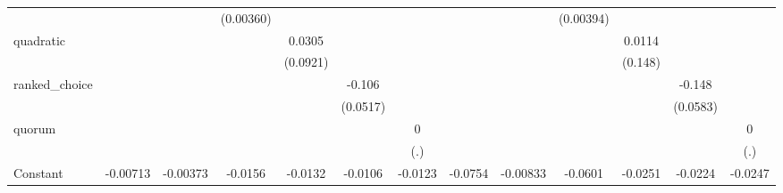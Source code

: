 {\begin{tabular}{l*{12}{c}}
                    &                     &                     &   (0.00360)         &                     &                     &                     &                     &                     &   (0.00394)         &                     &                     &                     \\
quadratic           &                     &                     &                     &      0.0305         &                     &                     &                     &                     &                     &      0.0114         &                     &                     \\
                    &                     &                     &                     &    (0.0921)         &                     &                     &                     &                     &                     &     (0.148)         &                     &                     \\
ranked\_choice       &                     &                     &                     &                     &      -0.106\sym{**} &                     &                     &                     &                     &                     &      -0.148\sym{**} &                     \\
                    &                     &                     &                     &                     &    (0.0517)         &                     &                     &                     &                     &                     &    (0.0583)         &                     \\
quorum              &                     &                     &                     &                     &                     &           0         &                     &                     &                     &                     &                     &           0         \\
                    &                     &                     &                     &                     &                     &         (.)         &                     &                     &                     &                     &                     &         (.)         \\
Constant            &    -0.00713         &    -0.00373         &     -0.0156         &     -0.0132\sym{***}&     -0.0106\sym{***}&     -0.0123\sym{***}&     -0.0754         &    -0.00833         &     -0.0601\sym{***}&     -0.0251\sym{***}&     -0.0224\sym{***}&     -0.0247\sym{***}\\

\end{tabular}}
